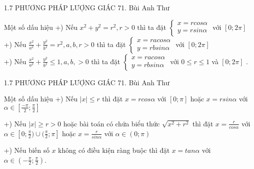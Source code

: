 \begin{frame}{1.7 PHƯƠNG PHÁP LƯỢNG GIÁC \hspace{3cm}  71. Bùi Anh Thư}  
\begin{block}{Một số dấu hiệu}
  +) Nếu $x^2+y^2=r^2, r>0$ thì ta đặt  $\left\{
    \begin{array}{cc}
        x=rcos\alpha\\
        y=rsin\alpha
    \end{array}
    \right.$
    với \alpha \in $[0;2\pi]$ \\
+) Nếu $\frac{x^2}{a^2}+\frac{y^2}{b^2}=r^2, a,b,r>0$ thì ta đặt $\left\{
    \begin{array}{cc}
        x=racos\alpha\\
        y=rbsin\alpha
    \end{array}
    \right.$
    với \alpha \in $[0;2\pi]$ \\
    +) Nếu $\frac{x^2}{a^2}+\frac{y^2}{b^2} \leq 1, a,b,>0$ thì ta đặt $\left\{
    \begin{array}{cc}
        x=racos\alpha\\
        y=rbsin\alpha
    \end{array}
    \right.$
    với $0\leq r\leq 1$ và \alpha \in $[0;2\pi]$ .\\
    \end{block} 
\end{frame}

\begin{frame}{1.7 PHƯƠNG PHÁP LƯỢNG GIÁC \hspace{3cm}  71. Bùi Anh Thư}  
\begin{block}{Một số dấu hiệu}
    +) Nếu $|x|\leq r$ thì đặt $x=rcos\alpha $ với \alpha \in $[0;\pi]$ hoặc $x=rsin\alpha$ với $\alpha \in [\frac{-\pi}{2};\frac{\pi}{2}]$\\
    \vspace{0,4cm}
    
    +) Nếu $|x|\geq r >0$ hoặc bài toán có chứa biểu thức $\sqrt{x^2+r^2}$ thì đặt $x=\frac{r}{cos\alpha}$ với $\alpha \in [0;\frac{\pi}{2}) \cup (\frac{\pi}{2};\pi]$ hoặc $x=\frac{r}{sin\alpha}$ với $\alpha \in (0;\pi)$\\
    \vspace{0,4cm}
    
    +) Nếu biến số $x$ không có điều kiện ràng buộc thì đặt $x=tan\alpha$ với $\alpha \in (-\frac{\pi}{2};\frac{\pi}{2})$.
\end{block} 
\end{frame}

